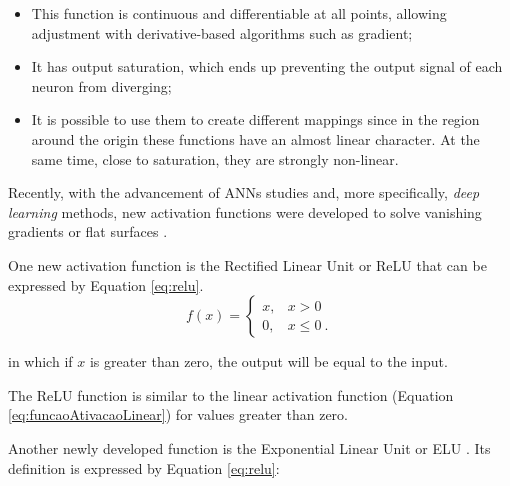 \documentclass[ruled,graybox]{svmult}
\begin{document}
\begin{itemize}
    \item %
    This function is continuous and differentiable at all points, allowing adjustment with derivative-based algorithms such as gradient;
    \item It has 
    output saturation, which ends up preventing the output signal of each neuron from diverging;
    \item It is possible to use them to create different mappings since 
    in the region around the origin 
    these functions 
    have an almost linear character. At the same time, close to saturation, they are strongly non-linear.
\end{itemize}


Recently, with the advancement of ANNs studies and, more specifically, \textit{deep learning} methods, new activation functions were developed to solve vanishing gradients or flat surfaces \cite{Fahlman1988}.

One new activation function is the Rectified Linear Unit or ReLU \cite{Maas2013} %
that can be expressed by Equation \ref{eq:relu}.
\begin{equation}
	\label{eq:relu}
	f(x) = \left\{\begin{matrix}
		x, & x > 0    \\
		0, & x \leq 0 \:.
	\end{matrix}\right.
\end{equation}

\noindent
in which if $x$ is greater than zero, the output will be equal to the input.

The ReLU function is similar to the linear activation function (Equation \ref{eq:funcaoAtivacaoLinear}) for values greater than zero. %

Another newly developed function is the Exponential Linear Unit or ELU \cite{Clevert2016}. Its definition is expressed by Equation \ref{eq:relu}:

\end{document}

